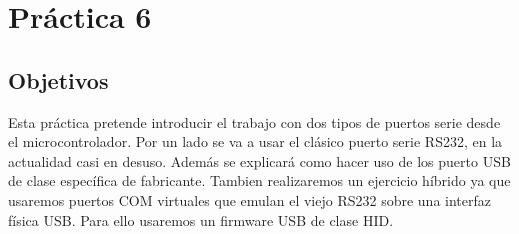 \documentclass[a4paper, 11pt]{article}
\begin{document}
\section{Práctica 6}

\subsection{Objetivos}
Esta práctica pretende introducir el trabajo con dos tipos de
puertos serie desde el microcontrolador.  Por un lado se va a usar
el clásico puerto serie RS232, en la actualidad casi en desuso.
Además se explicará como hacer uso de los puerto USB de clase
específica de fabricante. Tambien realizaremos un ejercicio híbrido
ya que usaremos puertos COM virtuales que emulan el viejo RS232
sobre una interfaz física USB. Para ello usaremos un firmware USB
de clase HID.
\end{document}
